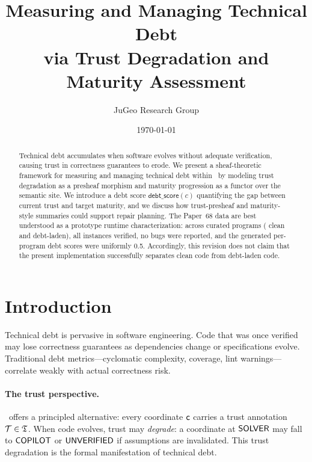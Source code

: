 \documentclass[11pt]{article}
\title{\textbf{Measuring and Managing Technical Debt\\
via Trust Degradation and Maturity Assessment}}
\author{JuGeo Research Group}
\date{\today}
\newcommand{\DebtScore}{\mathsf{debt\_score}}
\begin{document}
\maketitle

\begin{abstract}
Technical debt accumulates when software evolves without adequate
verification, causing trust in correctness guarantees to erode.
We present a sheaf-theoretic framework for measuring and managing
technical debt within \JuGeo\ by modeling trust degradation as a
presheaf morphism and maturity progression as a functor over the
semantic site. We introduce a debt score $\DebtScore(c)$ quantifying the gap
between current trust and target maturity, and we discuss how trust-presheaf
and maturity-style summaries could support repair planning. The Paper~68 data
are best understood as a prototype runtime characterization: across
\ppLXVIIIprogramCount{} curated programs (\ppLXVIIIcleanCount{} clean and
\ppLXVIIIdebtCount{} debt-laden), all instances verified, no bugs were
reported, and the generated per-program debt scores were uniformly 0.5.
Accordingly, this revision does not claim that the present implementation
successfully separates clean code from debt-laden code.
\end{abstract}

\newpage

\section{Introduction}\label{sec:intro}

Technical debt is pervasive in software engineering.  Code that was
once verified may lose correctness guarantees as dependencies change or
specifications evolve.  Traditional debt metrics---cyclomatic
complexity, coverage, lint warnings---correlate weakly with actual
correctness risk.

\paragraph{The trust perspective.}
\JuGeo\ offers a principled alternative: every coordinate $\mathsf{c}$
carries a trust annotation $\mathcal{T} \in \mathfrak{T}$.  When code evolves,
trust may \emph{degrade}: a coordinate at $\mathsf{SOLVER}$ may fall to
$\mathsf{COPILOT}$ or $\mathsf{UNVERIFIED}$ if assumptions are invalidated.  This trust
degradation is the formal manifestation of technical debt.
\end{document}
